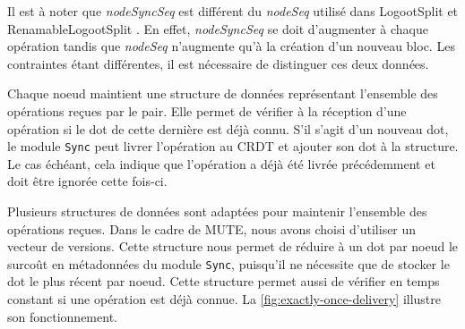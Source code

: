 Il est à noter que \emph{nodeSyncSeq} est différent du \emph{nodeSeq} utilisé dans LogootSplit et RenamableLogootSplit .
En effet, \emph{nodeSyncSeq} se doit d'augmenter à chaque opération tandis que \emph{nodeSeq} n'augmente qu'à la création d'un nouveau bloc.
Les contraintes étant différentes, il est nécessaire de distinguer ces deux données.

Chaque noeud maintient une structure de données représentant l'ensemble des opérations reçues par le pair.
Elle permet de vérifier à la réception d'une opération si le dot de cette dernière est déjà connu.
S'il s'agit d'un nouveau dot, le module \texttt{Sync} peut livrer l'opération au \ac{CRDT} et ajouter son dot à la structure.
Le cas échéant, cela indique que l'opération a déjà été livrée précédemment et doit être ignorée cette fois-ci.

Plusieurs structures de données sont adaptées pour maintenir l'ensemble des opérations reçues.
Dans le cadre de MUTE, nous avons choisi d'utiliser un vecteur de versions.
Cette structure nous permet de réduire à un dot par noeud le surcoût en métadonnées du module \texttt{Sync}, puisqu'il ne nécessite que de stocker le dot le plus récent par noeud.
Cette structure permet aussi de vérifier en temps constant si une opération est déjà connue.
La \autoref{fig:exactly-once-delivery} illustre son fonctionnement.

